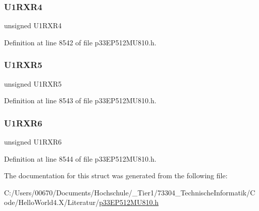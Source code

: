 \subsubsection{\texorpdfstring{U1\+R\+X\+R4}{U1RXR4}}
{\footnotesize\ttfamily unsigned U1\+R\+X\+R4}



Definition at line 8542 of file p33\+E\+P512\+M\+U810.\+h.

\mbox{\label{structtag_r_p_i_n_r18_b_i_t_s_a889b83444536e6cd71684ffbfcfbaba4}} 
\subsubsection{\texorpdfstring{U1\+R\+X\+R5}{U1RXR5}}
{\footnotesize\ttfamily unsigned U1\+R\+X\+R5}



Definition at line 8543 of file p33\+E\+P512\+M\+U810.\+h.

\mbox{\label{structtag_r_p_i_n_r18_b_i_t_s_ad58bf79b28f6a3fcb75948f1f07e08d5}} 
\subsubsection{\texorpdfstring{U1\+R\+X\+R6}{U1RXR6}}
{\footnotesize\ttfamily unsigned U1\+R\+X\+R6}



Definition at line 8544 of file p33\+E\+P512\+M\+U810.\+h.



The documentation for this struct was generated from the following file\+:\begin{DoxyCompactItemize}
\item 
C\+:/\+Users/00670/\+Documents/\+Hochschule/\+\_\+\+Tier1/73304\+\_\+\+Technische\+Informatik/\+Code/\+Hello\+World4.\+X/\+Literatur/\hyperlink{p33_e_p512_m_u810_8h}{p33\+E\+P512\+M\+U810.\+h}\end{DoxyCompactItemize}
